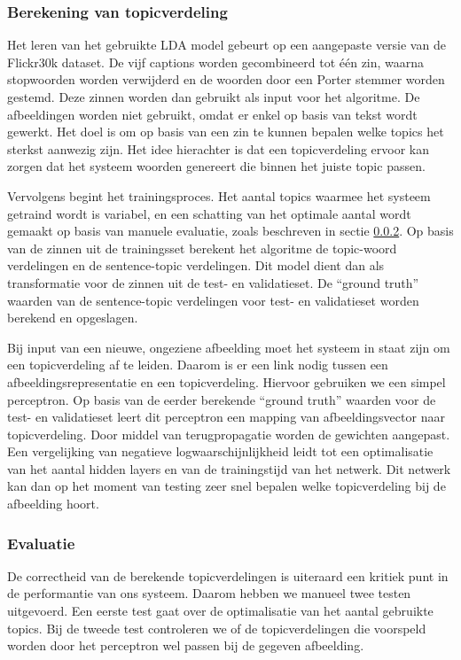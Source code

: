 \subsubsection{Berekening van topicverdeling}
\label{subs:Berekening van topicverdeling}
Het leren van het gebruikte LDA model gebeurt op een aangepaste versie van de Flickr30k dataset. De vijf captions worden gecombineerd tot \'e\'en zin, waarna stopwoorden worden verwijderd en de woorden door een Porter stemmer worden gestemd. Deze zinnen worden dan gebruikt als input voor het algoritme. De afbeeldingen worden niet gebruikt, omdat er enkel op basis van tekst wordt gewerkt. Het doel is om op basis van een zin te kunnen bepalen welke topics het sterkst aanwezig zijn. Het idee hierachter is dat een topicverdeling ervoor kan zorgen dat het systeem woorden genereert die binnen het juiste topic passen.

Vervolgens begint het trainingsproces. Het aantal topics waarmee het systeem getraind wordt is variabel, en een schatting van het optimale aantal wordt gemaakt op basis van manuele evaluatie, zoals beschreven in sectie \ref{subs:Evaluatie}. Op basis van de zinnen uit de trainingsset berekent het algoritme de topic-woord verdelingen en de sentence-topic verdelingen. Dit model dient dan als transformatie voor de zinnen uit de test- en validatieset. De ``ground truth'' waarden van de sentence-topic verdelingen voor test- en validatieset worden berekend en opgeslagen.

Bij input van een nieuwe, ongeziene afbeelding moet het systeem in staat zijn om een topicverdeling af te leiden. Daarom is er een link nodig tussen een afbeeldingsrepresentatie en een topicverdeling. Hiervoor gebruiken we een simpel perceptron. Op basis van de eerder berekende ``ground truth'' waarden voor de test- en validatieset leert dit perceptron een mapping van afbeeldingsvector naar topicverdeling. Door middel van terugpropagatie worden de gewichten aangepast. Een vergelijking van negatieve logwaarschijnlijkheid leidt tot een optimalisatie van het aantal hidden layers en van de trainingstijd van het netwerk. Dit netwerk kan dan op het moment van testing zeer snel bepalen welke topicverdeling bij de afbeelding hoort.

\subsubsection{Evaluatie}
\label{subs:Evaluatie}
De correctheid van de berekende topicverdelingen is uiteraard een kritiek punt in de performantie van ons systeem. Daarom hebben we manueel twee testen uitgevoerd. Een eerste test gaat over de optimalisatie van het aantal gebruikte topics. Bij de tweede test controleren we of de topicverdelingen die voorspeld worden door het perceptron wel passen bij de gegeven afbeelding.

